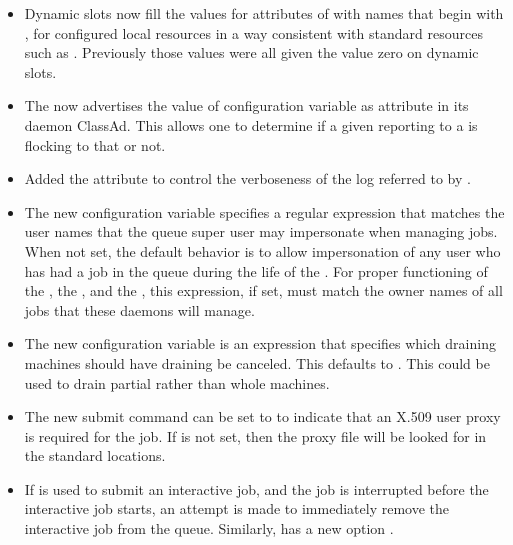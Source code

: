 \begin{itemize}

\item Dynamic slots now fill the values for attributes of with names
that begin with
, 
for configured local resources in a way consistent with standard resources
such as .
Previously those values were all given the value zero on dynamic slots.

\item The  now advertises the value of configuration variable
 as attribute  in 
its daemon ClassAd.  This allows one to determine if a given
 reporting to a  is flocking to that 
 or not.

\item Added the attribute  to control the verboseness of
the log referred to by .

\item The new configuration variable
 specifies a regular
expression that matches the user names that
the queue super user may impersonate when managing jobs.  When not
set, the default behavior is to allow impersonation of any user who
has had a job in the queue during the life of the .  For
proper functioning of the , the , and
the , this expression, if set, must match the owner
names of all jobs that these daemons will manage.

\item The new configuration variable 
is an expression that specifies which draining machines should have 
draining be canceled.  
This defaults to .  
This could be used to drain partial rather than whole machines.

\item The new submit command  can be set
to  to indicate that an X.509 user proxy is required for the job. 
If  is not set, 
then the proxy file will be looked for in the standard locations.

\item If  is used to submit an interactive job,
and the job is interrupted before the interactive job starts,
an attempt is made to immediately remove the interactive job from the queue.
Similarly,  has a new option .


\end{itemize}

